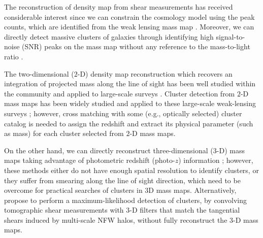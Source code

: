 \documentclass[twocolumn]{aastex63}
\begin{document}

The reconstruction of density map from shear measurements has received
considerable interest since
we can constrain the cosmology model using the peak counts, which are
identified from the weak lensing mass map
\citep{WL-massMap-peakcounts-Jain2000,WL-massMap-peakcountsAna-Fan2010,WL-massMap-peakcountsFM-Lin2016}.
Moreover, we can directly detect massive clusters of galaxies through
identifying high signal-to-noise (SNR) peaks on the mass map without any
reference to the mass-to-light ratio
\citep{WL-massMap-clusDet-Schneider1996,WL-massMap-clusDet-Hamana2004}.

The two-dimensional ($2$-D) density map reconstruction which recovers an
integration of projected mass along the line of sight has been well studied
within the community
\citep{massMap-KS1993,WL-massMap-Glimpse2D-Lanusse2016,sparseBaysianMassMap-Price2020}
and applied to large-scale surveys
\citep{HSC1-massMaps,massMapDES-Chang2018,DES-SV-massMap-sparsity}.
Cluster detection from $2$-D mass maps has been widely studied and applied to
these large-scale weak-lensing surveys
\citep{WL-massMap-clusDet-CFHT-Shan2012,WL-massMap-clusDet-HSC-Miyazaki2018,WL-massMap-clusDet-HSC-Hamana2020};
however, cross matching with some (e.g., optically selected) cluster catalog is
needed to assign the redshift and extract its physical parameter (such as mass)
for each cluster selected from $2$-D mass maps.

On the other hand, we can directly reconstruct three-dimensional ($3$-D) mass
maps taking advantage of photometric redshift (photo-$z$) information
\citep{massMap3D-Hu2002,massMap3D-Bacon2003,LSS-massMap-Wiener-Simon2009,WL-massMap-VanderPlas2011};
however, these methods either do not have enough spatial resolution to identify
clusters, or they suffer from smearing along the line of sight direction, which
need to be overcome for practical searches of clusters in 3D mass maps.
Alternatively, \citet{WL-clusDet-Hennawi2005} propose to perform a
maximum-likelihood detection of clusters, by convolving tomographic shear
measurements with $3$-D filters that match the tangential shears induced by
multi-scale NFW halos, without fully reconstruct the $3$-D mass maps.
\end{document}
